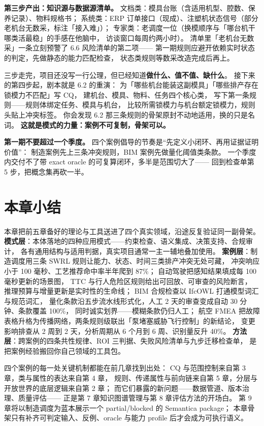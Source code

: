 \textbf{第三步产出：知识源与数据源清单。}
文档类：模具台账（含适用机型、腔数、保养记录）、物料规格书；
系统类：ERP 订单接口（现成）、注塑机状态信号（部分老机台无数采，标注「接入难」）；
专家类：老调度一位（换模顺序与「哪台机干哪类活最稳」的手感在他脑中，
访谈窗口每周约两小时）。
清单里「老机台无数采」一条立刻预警了 6.6 风险清单的第二项——
第一期规则应避开依赖实时状态的判定，先做静态的能力匹配检查，
状态类规则等数采改造完成后再上。

三步走完，项目还没写一行公理，但已经知道\textbf{做什么、值不值、缺什么}。
接下来的第四步起，剧本就是 6.2 的重演：
为「哪些机台能装这副模具」「哪些排产存在锁模力不匹配」写 CQ，
建机台、模具、物料、任务四个核心类，
写下第一条规则——规则体绑定任务、模具与机台，
比较所需锁模力与机台额定锁模力，规则头贴上冲突标签。
你会发现 6.2 那三条规则的骨架原封不动地适用，换的只是名词。
\textbf{这就是模式的力量：案例不可复制，骨架可以。}

\begin{noteblock}
\textbf{第一期不要超过一个季度。}
四个案例倡导的节奏是“先定义小闭环、再用证据证明价值”：
制造案例先上三条冲突规则，BIM 案例先做量化阈值类条款。
一个季度内交付不了带 exact oracle 的可复算闭环，多半是范围切大了——
回到检查单第 5 步，把概念集再砍一半。
\end{noteblock}

\section{本章小结}

本章把前五章备好的理论与工具送进了四个真实领域，沿途反复验证同一副骨架。
\textbf{模式层}：本体落地的四种应用模式——约束检查、语义集成、决策支持、合规审计，
各有通用结构与适用判据，真实项目通常一主一辅地叠加使用。
\textbf{案例层}：制造调度用三条 SWRL 规则让能力、状态、时间三类排产冲突无处可藏，
冲突响应小于 100 毫秒、工艺推荐命中率半年爬到 87\%；
自动驾驶把感知结果填成每 100 毫秒更新的场景图，
TTC 与行人危险区规则给出可回放、可审查的风险断言，
推理预算与增量更新是实时性的生命线；
BIM 合规检查以 IfcOWL 打通模型词汇与规范词汇，
量化条款沿五步流水线形式化，人工 2 天的审查变成自动 30 分钟、条款覆盖 100\%，
同时诚实划界——模糊条款仍归人工；
航空 FMEA 把故障表格升格为传播网络，两条规则级联出「泵堵塞威胁飞行控制」的新结论，
变更影响排查从 2 周到 2 天，分析周期从 6 个月到 6 周、识别量反升 40\%。
\textbf{方法层}：跨案例的四条共性规律、ROI 三判据、失败风险清单与九步迁移检查单，
是把案例经验搬回你自己领域的工具包。

四个案例的每一处关键机制都能在前几章找到出处：
CQ 与范围控制来自第 3 章，类与属性的表达来自第 4 章，
规则、传递属性与前向链来自第 5 章，分层与开放世界的底层逻辑来自第 2 章；
而它们暴露的新问题——数据管道、版本治理、质量评估——
正是第 7 章知识图谱管理与第 8 章评估方法的开场白。
第 9 章将以制造调度为蓝本展示一个 partial/blocked 的 Semantica package；
本章骨架只有补齐可判定输入、反例、oracle 与能力 profile 后才会成为可执行语义。

